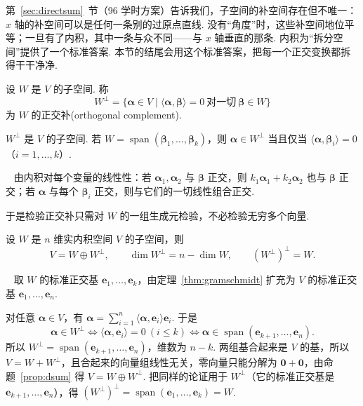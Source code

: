 \documentclass[lang=cn,10.5pt,scheme=chinese,toc=twocol,section,chinesefont=nofont,
twoside,citestyle=gb7714-2015,bibstyle=gb7714-2015]{elegantbook}
\DeclareRobustCommand{\textbf}[1]{{\lnsemiboldlatin\lnsemiboldcjk #1}}
\newcommand{\vv}[1]{\boldsymbol{#1}}
\newcommand{\zero}{\boldsymbol{0}}          %
\numberwithin{equation}{section}   %
\newcommand{\spn}{\operatorname{span}}      %
\newcommand*{\lnlabel}[1]{{\sffamily\bfseries\color{black}#1}}
\renewenvironment{proof}{%
	\par\noindent\lnlabel{\proofname}\;\ \color{black!90}\cfs}{\par}
\begin{document}
\begin{motivebox}
  第~\ref{sec:directsum}~节（96 学时方案）告诉我们，子空间的补空间存在但不唯一：$x$ 轴的补空间可以是任何一条别的过原点直线. 没有“角度”时，这些补空间地位平等；一旦有了内积，其中一条与众不同——\textbf{与 $x$ 轴垂直的那条}. 内积为“拆分空间”提供了一个标准答案. 本节的结尾会用这个标准答案，把\textbf{每一个}正交变换都拆得干干净净.%
\end{motivebox}

\begin{definition}
  设 $W$ 是 $V$ 的子空间. 称
  \[W^\perp=\{\vv\alpha\in V\mid \langle\vv\alpha,\vv\beta\rangle=0\ \text{对一切}\ \vv\beta\in W\}\]
  为 $W$ 的\textbf{正交补}(orthogonal complement).
\end{definition}

\begin{proposition}
  $W^\perp$ 是 $V$ 的子空间. 若 $W=\spn(\vv\beta_1,\ldots,\vv\beta_k)$，则 $\vv\alpha\in W^\perp$ 当且仅当 $\langle\vv\alpha,\vv\beta_i\rangle=0$（$i=1,\ldots,k$）.
\end{proposition}
\begin{proof}
  由内积对每个变量的线性性：若 $\vv\alpha_1,\vv\alpha_2$ 与 $\vv\beta$ 正交，则 $k_1\vv\alpha_1+k_2\vv\alpha_2$ 也与 $\vv\beta$ 正交；若 $\vv\alpha$ 与每个 $\vv\beta_i$ 正交，则与它们的一切线性组合正交.
\end{proof}

于是检验正交补只需对 $W$ 的一组生成元检验，不必检验无穷多个向量.

\begin{theorem}[正交分解定理]\label{thm:orthdecomp}
  设 $W$ 是 $n$ 维实内积空间 $V$ 的子空间，则
  \[V=W\oplus W^\perp,\qquad \dim W^\perp=n-\dim W,\qquad (W^\perp)^\perp=W.\]
\end{theorem}
\begin{proof}
  取 $W$ 的标准正交基 $\vv e_1,\ldots,\vv e_k$，由定理~\ref{thm:gramschmidt} 扩充为 $V$ 的标准正交基 $\vv e_1,\ldots,\vv e_n$.

  对任意 $\vv\alpha\in V$，有 $\vv\alpha=\sum_{i=1}^n\langle\vv\alpha,\vv e_i\rangle\vv e_i$. 于是
  \[
    \vv\alpha\in W^\perp\iff\langle\vv\alpha,\vv e_i\rangle=0\ (i\le k)\iff\vv\alpha\in\spn(\vv e_{k+1},\ldots,\vv e_n).
  \]
  所以 $W^\perp=\spn(\vv e_{k+1},\ldots,\vv e_n)$，维数为 $n-k$. 两组基合起来是 $V$ 的基，所以 $V=W+W^\perp$，且合起来的向量组线性无关，零向量只能分解为 $\zero+\zero$，由命题~\ref{prop:dsum} 得 $V=W\oplus W^\perp$. 把同样的论证用于 $W^\perp$（它的标准正交基是 $\vv e_{k+1},\ldots,\vv e_n$），得 $(W^\perp)^\perp=\spn(\vv e_1,\ldots,\vv e_k)=W$.
\end{proof}
\end{document}
